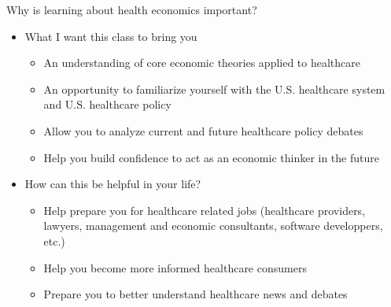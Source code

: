 \begin{frame}{Why is learning about health economics important?}

    \begin{itemize}
        \item What I want this class to bring you
        \begin{itemize}
            \item An understanding of core economic theories applied to healthcare
            \item An opportunity to familiarize yourself with the U.S. healthcare system and U.S. healthcare policy
            \item Allow you to analyze current and future healthcare policy debates
            \item Help you build confidence to act as an economic thinker in the future
        \end{itemize}
        \vspace{3mm}

        \item How can this be helpful in your life?
        \begin{itemize}
            \item Help prepare you for healthcare related jobs (healthcare providers, lawyers, management and economic consultants, software developpers, etc.)
            \item Help you become more informed healthcare consumers
            \item Prepare you to better understand healthcare news and debates
        \end{itemize}
        \vspace{3mm}
    \end{itemize}

\end{frame}
